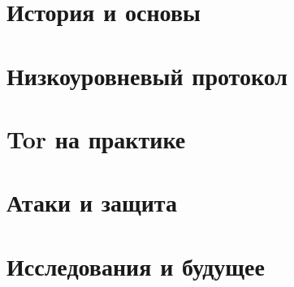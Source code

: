 \part{История и основы}




\part{Низкоуровневый протокол}












\part{Tor на практике}









\part{Атаки и защита}



\part{Исследования и будущее}



\appendix




